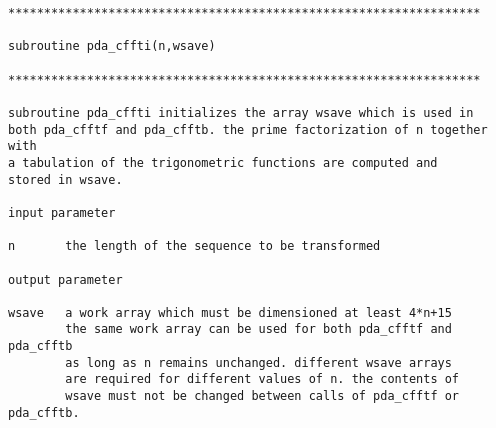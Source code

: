 
\begin{verbatim}
******************************************************************

subroutine pda_cffti(n,wsave)

******************************************************************

subroutine pda_cffti initializes the array wsave which is used in
both pda_cfftf and pda_cfftb. the prime factorization of n together with
a tabulation of the trigonometric functions are computed and
stored in wsave.

input parameter

n       the length of the sequence to be transformed

output parameter

wsave   a work array which must be dimensioned at least 4*n+15
        the same work array can be used for both pda_cfftf and pda_cfftb
        as long as n remains unchanged. different wsave arrays
        are required for different values of n. the contents of
        wsave must not be changed between calls of pda_cfftf or pda_cfftb.
\end{verbatim}


